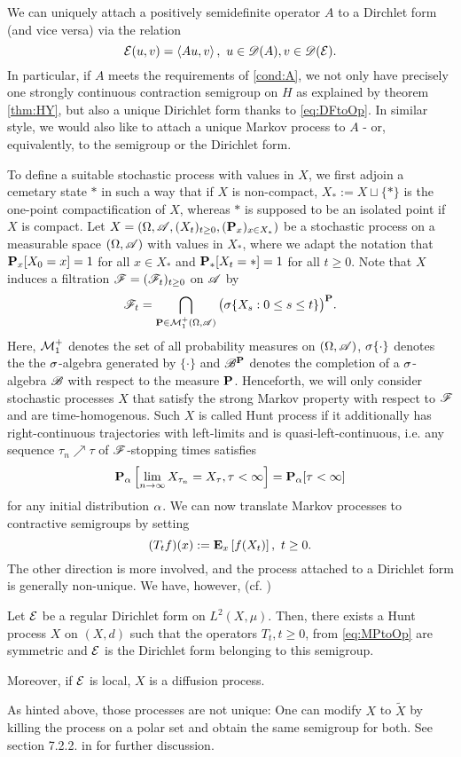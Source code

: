 We can uniquely attach a positively semidefinite operator $A$ to a Dirchlet form (and vice versa) via the relation 
\begin{equation}\label{eq:DFtoOp}
  \cE(u,v)=\left<Au,v\right>,\  u\in\scD(A),v\in\scD(\cE).
\end{equation}
In particular, if $A$ meets the requirements of \ref{cond:A}, we not only have precisely one strongly continuous contraction semigroup on $H$ as explained by theorem \ref{thm:HY}, but also a unique Dirichlet form thanks to \eqref{eq:DFtoOp}. In similar style, we would also like to attach a unique Markov process to $A$ - or, equivalently, to the semigroup or the Dirichlet form. 

To define a suitable stochastic process with values in $X$, we first adjoin a cemetary state $*$ in such a way that if $X$ is non-compact, $X_*:=X\sqcup\{*\}$ is the one-point compactification of $X$, whereas $*$ is supposed to be an isolated point if $X$ is compact. Let $X=\left(\gO,\scA,(X_t)_{t\geq0},(\Prob_x)_{x\in X_*}\right)$ be a stochastic process on a measurable space $(\gO,\scA)$ with values in $X_*$, where we adapt the notation that $\Prob_x[X_0=x]=1$ for all 
$x\in X_*$ and $\Prob_*[X_t=*]=1$ for all $t\geq0$. Note that $X$ induces a filtration $\scF=(\scF_t)_{t\geq0}$ on $\scA$ by 
\[
  \scF_t=\bigcap_{\Prob\in\cM^+_1(\gO,\scA)} \big(\gs\{X_s:0\leq s\leq t\}\big)^\Prob.
\]
Here, $\cM^+_1$ denotes the set of all probability measures on $(\gO,\scA)$, $\gs\{\cdot\}$ denotes the the $\gs$-algebra generated by $\{\cdot\}$ and $\scB^\Prob$ denotes the completion of a $\gs$-algebra $\scB$ with respect to the measure $\Prob$. Henceforth, we will only consider stochastic processes $X$ that satisfy the strong Markov property with respect to $\scF$ and are time-homogenous. Such $X$ is called Hunt process if it additionally has right-continuous trajectories with left-limits and is quasi-left-continuous, i.e.  any sequence $\tau_n\nearrow\tau$ of $\scF$-stopping times satisfies
\[
  \Prob_\ga\left[\lim_{n\to\infty} X_{\tau_n}=X_\tau,\tau<\infty\right]=\Prob_\ga[\tau<\infty]
\]
for any initial distribution $\ga$. We can now translate Markov processes to contractive semigroups by setting
\begin{equation}\label{eq:MPtoOp}
  (T_tf)(x):=\PTEp{f(X_t)}{x},\ t\geq0.
\end{equation}
The other direction is more involved, and the process attached to a Dirichlet form is generally non-unique. We have, however, (cf. \cite[theorems 7.2.1 and 7.2.2]{fukushima2011dirichlet})
\begin{thm}\label{thm:fukushima}
  Let $\cE$ be a regular Dirichlet form on $L^2(X,\mu)$. Then, there exists a Hunt process $X$ on $(X,d)$ such that the operators $T_t, t\geq0$, from \eqref{eq:MPtoOp} are symmetric and $\cE$ is the Dirichlet form belonging to this semigroup.
  
  Moreover, if $\cE$ is local, $X$ is a diffusion process.
\end{thm}
As hinted above, those processes are not unique: One can modify $X$ to $\tilde X$ by killing the process on a polar set and obtain the same semigroup for both. See section 7.2.2. in \cite{fukushima2011dirichlet} for further discussion.


